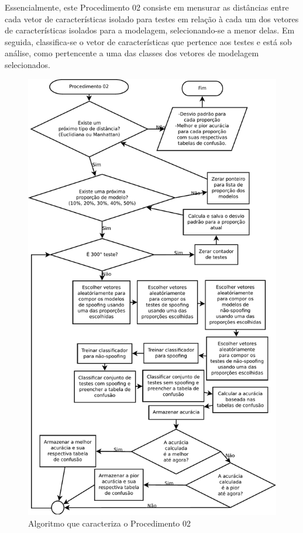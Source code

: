 		\par Essencialmente, este Procedimento 02 consiste em mensurar as distâncias entre cada vetor de características isolado para testes em relação à cada um dos vetores de características isolados para a modelagem, selecionando-se a menor delas. Em seguida, classifica-se o vetor de características que pertence aos testes e está sob análise, como pertencente a uma das classes dos vetores de modelagem selecionados.   

		\begin{figure}[H]
			\centering
			\includegraphics[width=.85\linewidth]{images/AlgoProcedure02}
			\caption{Algoritmo que caracteriza o Procedimento 02}
			\label{fig:experiment02Algo}
		\end{figure}
		
		

